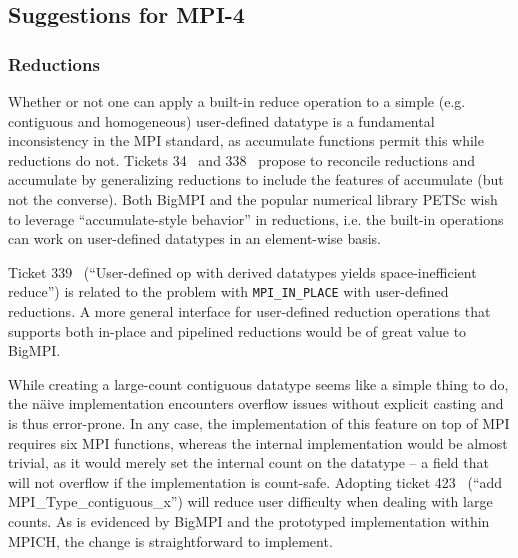 
\subsection{Suggestions for MPI-4}

\subsubsection{Reductions}

Whether or not one can apply a built-in reduce operation to a simple 
(e.g. contiguous and homogeneous) user-defined datatype
is a fundamental inconsistency in the MPI standard, as accumulate
functions permit this while reductions do not.
Tickets 34~\cite{ticket34} and 338~\cite{ticket338}
propose to reconcile reductions and accumulate by generalizing
reductions to include the features of accumulate (but not the converse).
Both BigMPI and the popular numerical library PETSc wish to leverage 
``accumulate-style behavior'' in reductions, i.e.  the built-in operations 
can work on user-defined datatypes in an element-wise basis.

Ticket 339~\cite{ticket339} %
(``User-defined op with derived datatypes yields space-inefficient reduce'')
is related to the problem with \texttt{MPI\_IN\_PLACE} with user-defined reductions.
A more general interface for user-defined reduction operations that supports both
in-place and pipelined reductions would be of great value to BigMPI.

While creating a large-count contiguous datatype seems like a simple thing to do,
the n{\"a}ive implementation encounters overflow issues without explicit casting and is
thus error-prone.  In any case, the implementation of this feature on top of MPI
requires six MPI functions, whereas the internal implementation would be almost trivial,
as it would merely set the internal count on the datatype -- a field that will not overflow 
if the implementation is count-safe.
Adopting ticket 423~\cite{ticket423} %
(``add MPI\_Type\_contiguous\_x'') will reduce user difficulty when dealing with large counts.
As is evidenced by BigMPI and the prototyped implementation within MPICH, 
the change is straightforward to implement.

